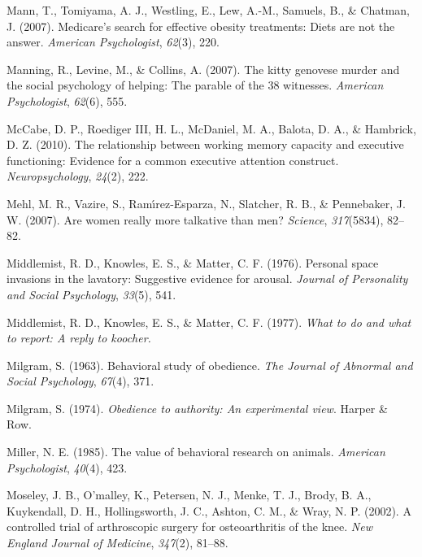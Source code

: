 \documentclass[
]{krantz}
\newlength{\cslhangindent}
\newenvironment{CSLReferences}[2] %
 {\begin{list}{}{%
  \setlength{\itemindent}{0pt}
  \setlength{\leftmargin}{0pt}
  \setlength{\parsep}{0pt}
  \ifodd #1
   \setlength{\leftmargin}{\cslhangindent}
   \setlength{\itemindent}{-1\cslhangindent}
  \fi
  \setlength{\itemsep}{#2\baselineskip}}}
 {\end{list}}
\begin{document}
\begin{CSLReferences}{1}{0}
Mann, T., Tomiyama, A. J., Westling, E., Lew, A.-M., Samuels, B., \& Chatman, J. (2007). Medicare's search for effective obesity treatments: Diets are not the answer. \emph{American Psychologist}, \emph{62}(3), 220.

Manning, R., Levine, M., \& Collins, A. (2007). The kitty genovese murder and the social psychology of helping: The parable of the 38 witnesses. \emph{American Psychologist}, \emph{62}(6), 555.

McCabe, D. P., Roediger III, H. L., McDaniel, M. A., Balota, D. A., \& Hambrick, D. Z. (2010). The relationship between working memory capacity and executive functioning: Evidence for a common executive attention construct. \emph{Neuropsychology}, \emph{24}(2), 222.

Mehl, M. R., Vazire, S., Ramı́rez-Esparza, N., Slatcher, R. B., \& Pennebaker, J. W. (2007). Are women really more talkative than men? \emph{Science}, \emph{317}(5834), 82--82.

Middlemist, R. D., Knowles, E. S., \& Matter, C. F. (1976). Personal space invasions in the lavatory: Suggestive evidence for arousal. \emph{Journal of Personality and Social Psychology}, \emph{33}(5), 541.

Middlemist, R. D., Knowles, E. S., \& Matter, C. F. (1977). \emph{What to do and what to report: A reply to koocher.}

Milgram, S. (1963). Behavioral study of obedience. \emph{The Journal of Abnormal and Social Psychology}, \emph{67}(4), 371.

Milgram, S. (1974). \emph{Obedience to authority: An experimental view}. Harper \& Row.

Miller, N. E. (1985). The value of behavioral research on animals. \emph{American Psychologist}, \emph{40}(4), 423.

Moseley, J. B., O'malley, K., Petersen, N. J., Menke, T. J., Brody, B. A., Kuykendall, D. H., Hollingsworth, J. C., Ashton, C. M., \& Wray, N. P. (2002). A controlled trial of arthroscopic surgery for osteoarthritis of the knee. \emph{New England Journal of Medicine}, \emph{347}(2), 81--88.


\end{CSLReferences}
\end{document}

